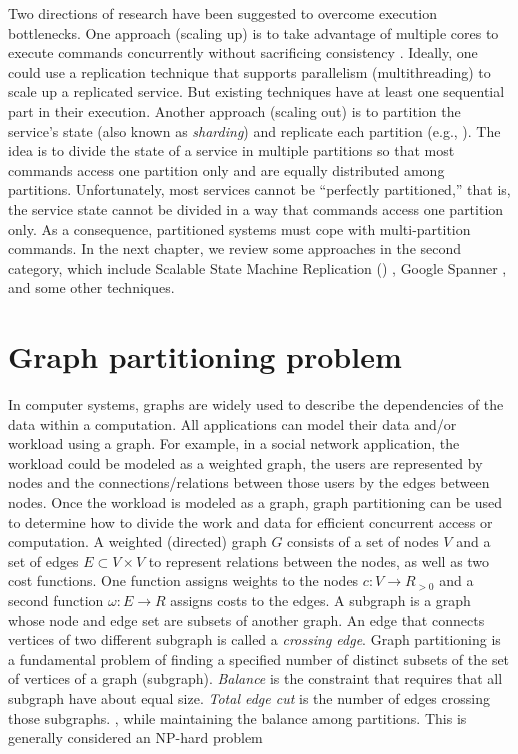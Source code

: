 Two directions of research have been suggested to overcome execution
bottlenecks. One approach (scaling up) is to take advantage of multiple cores to
execute commands concurrently without sacrificing consistency
\cite{Kapritsos:2012um,Marandi:2014bj,Kotla:2004ep,guo2014rex}. Ideally, one
could use a replication technique that supports parallelism (multithreading) to
scale up a replicated service. But existing techniques have at least one
sequential part in their execution. Another approach (scaling out) is to
partition the service's state (also known as \emph{sharding}) and replicate each
partition (e.g., \cite{Glendenning:2011kj,Marandi:2011dj}). The idea is to
divide the state of a service in multiple partitions so that most commands
access one partition only and are equally distributed among partitions.
Unfortunately, most services cannot be ``perfectly partitioned,'' that is, the
service state cannot be divided in a way that commands access one partition
only. As a consequence, partitioned systems must cope with multi-partition
commands. In the next chapter, we review some approaches in the second category,
which include Scalable State Machine Replication (\ssmr) \cite{bezerra2014ssmr},
Google Spanner \cite{corbett2013spanner}, and some other techniques.


\section{Graph partitioning problem}

In computer systems, graphs are widely used to describe the dependencies of the
data within a computation. All applications can model their data and/or workload
using a graph. For example, in a social network application, the workload could be
modeled as a weighted graph, the users are represented by nodes and the
connections/relations between those users by the edges between nodes. Once the
workload is modeled as a graph, graph partitioning can be used to
determine how to divide the work and data for efficient concurrent access or
computation.
A weighted (directed) graph $G$ consists of a set of nodes $V$ and
a set of edges $E \subset V \times V$ to represent relations between the nodes,
as well as two cost functions. One function assigns weights to the nodes $c : V
\rightarrow R_{>0}$ and a second function $\omega : E \rightarrow R$ assigns
costs to the edges. A subgraph is a graph whose
node and edge set are subsets of another graph. An edge that connects vertices
of two different subgraph is called a \emph{crossing edge}. Graph partitioning
is a fundamental problem of finding a specified number of distinct subsets of
the set of vertices of a graph (subgraph). \emph{Balance} is the constraint that
requires that all subgraph have about equal size. \emph{Total edge cut} is the
number of edges crossing those subgraphs. , while maintaining
the balance among partitions. This is generally considered an NP-hard
problem \cite{karypis1998multilevelk}

